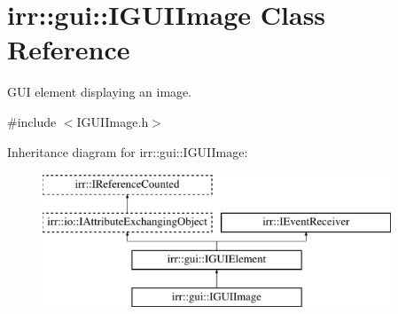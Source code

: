 \hypertarget{classirr_1_1gui_1_1IGUIImage}{}\section{irr\+:\+:gui\+:\+:I\+G\+U\+I\+Image Class Reference}
\label{classirr_1_1gui_1_1IGUIImage}


G\+UI element displaying an image.  




{\ttfamily \#include $<$I\+G\+U\+I\+Image.\+h$>$}

Inheritance diagram for irr\+:\+:gui\+:\+:I\+G\+U\+I\+Image\+:\begin{figure}[H]
\begin{center}
\leavevmode
\includegraphics[height=4.000000cm]{classirr_1_1gui_1_1IGUIImage}
\end{center}
\end{figure}
